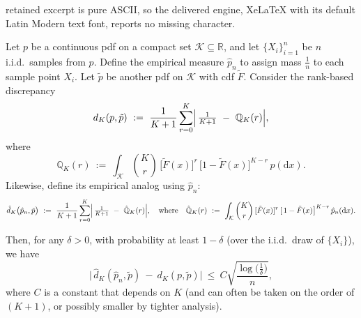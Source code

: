 \documentclass[10pt,a4paper]{amsart}
\begin{document}
retained excerpt is pure ASCII, so the delivered engine, XeLaTeX with its default Latin Modern text font, reports no missing character.
\begin{theorem} \label{theorem: Finite-Sample Deviation Bound}
\label{thm:rank_dev_bound}
Let $p$ be a continuous pdf on a compact set $\mathcal{K} \subseteq \mathbb{R}$, 
and let $\{X_i\}_{i=1}^n$ be $n$ i.i.d.\ samples from $p$. 
Define the empirical measure $\hat{p}_n$ to assign mass $\tfrac{1}{n}$ to each sample point $X_i$. 
Let $\tilde{p}$ be another pdf on $\mathcal{K}$ with cdf $\tilde{F}$. 
Consider the rank-based discrepancy
\[
d_{K}(p,\tilde{p}) 
~:=~
\frac{1}{K+1} 
\sum_{r=0}^{K}
\Bigl|\,
  \tfrac{1}{K+1}
  ~-~
  \mathbb{Q}_{K}(r) 
\Bigr|,
\]
where
\[
\mathbb{Q}_{K}(r)
~:=~
\int_{\mathcal{K}}
  \binom{K}{r}\,
  \bigl[\tilde{F}(x)\bigr]^r
  \,\bigl[1 - \tilde{F}(x)\bigr]^{K-r}
\,p(\mathrm{d}x).
\]
Likewise, define its empirical analog using $\hat{p}_n$:
\[
\hat{d}_{K}\bigl(\hat{p}_n,\tilde{p}\bigr)
~:=~
\frac{1}{K+1}
\sum_{r=0}^{K}
\Bigl|\,
  \tfrac{1}{K+1}
  ~-~
  \hat{\mathbb{Q}}_{K}(r)
\Bigr|,
\quad
\text{where}
\quad
\hat{\mathbb{Q}}_{K}(r)
~:=~
\int_{\mathcal{K}}
  \binom{K}{r}\,
  [\tilde{F}(x)]^r
  \,[\,1 - \tilde{F}(x)\bigr]^{K-r}
\,\hat{p}_n(\mathrm{d}x).
\]

Then, for any $\delta > 0$, with probability at least $1 - \delta$ (over the i.i.d.\ draw of $\{X_i\}$), we have
\[
\bigl|\,
  \hat{d}_{K}(\hat{p}_n, \tilde{p})
  ~-~
  d_{K}(p, \tilde{p})
\bigr|
~\le~
C \sqrt{\frac{\log\!\bigl(\tfrac{1}{\delta}\bigr)}{n}},
\]
where $C$ is a constant that depends on $K$ (and can often be taken on the order of $(K+1)$, or possibly smaller by tighter analysis).
\end{theorem}
\end{document}
